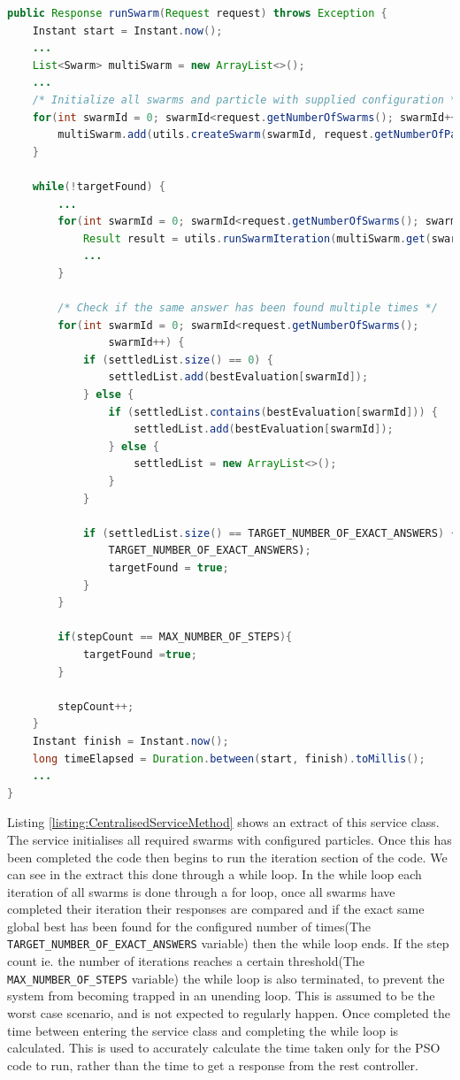 \documentclass[oneside,12pt]{book}
\begin{document}
\begin{lstlisting}[basicstyle=\footnotesize, language=Java]
public Response runSwarm(Request request) throws Exception {
    Instant start = Instant.now();
    ...
    List<Swarm> multiSwarm = new ArrayList<>();
    ...
    /* Initialize all swarms and particle with supplied configuration */
    for(int swarmId = 0; swarmId<request.getNumberOfSwarms(); swarmId++) {
        multiSwarm.add(utils.createSwarm(swarmId, request.getNumberOfParticles(), request.getConfigVariables()));
    }

    while(!targetFound) {
        ...
        for(int swarmId = 0; swarmId<request.getNumberOfSwarms(); swarmId++) {
            Result result = utils.runSwarmIteration(multiSwarm.get(swarmId), stepCount);
            ...
        }
        
        /* Check if the same answer has been found multiple times */
        for(int swarmId = 0; swarmId<request.getNumberOfSwarms(); 
                swarmId++) {
            if (settledList.size() == 0) {
                settledList.add(bestEvaluation[swarmId]);
            } else {
                if (settledList.contains(bestEvaluation[swarmId])) {
                    settledList.add(bestEvaluation[swarmId]);
                } else {
                    settledList = new ArrayList<>();
                }
            }

            if (settledList.size() == TARGET_NUMBER_OF_EXACT_ANSWERS) {
                TARGET_NUMBER_OF_EXACT_ANSWERS);
                targetFound = true;
            }
        }

        if(stepCount == MAX_NUMBER_OF_STEPS){
            targetFound =true;
        }

        stepCount++;
    }
    Instant finish = Instant.now();
    long timeElapsed = Duration.between(start, finish).toMillis();
    ...
}
\end{lstlisting}
\label{listing:CentralisedServiceMethod}

Listing \ref{listing:CentralisedServiceMethod} shows an extract of this service class. The service initialises all required swarms with configured particles.  Once this has been completed the code then begins to run the iteration section of the code. We can see in the extract this done through a while loop. In the while loop each iteration of all swarms is done through a for loop, once all swarms have completed their iteration their responses are compared and if the exact same global best has been found for the configured number of times(The \verb|TARGET_NUMBER_OF_EXACT_ANSWERS| variable) then the while loop ends. If the step count ie. the number of iterations reaches a certain threshold(The \verb|MAX_NUMBER_OF_STEPS| variable) the while loop is also terminated, to prevent the system from becoming trapped in an unending loop. This is assumed to be the worst case scenario, and is not expected to regularly happen. Once completed the time between entering the service class and completing the while loop is calculated. This is used to accurately calculate the time taken only for the PSO code to run, rather than the time to get a response from the rest controller.
\end{document}
